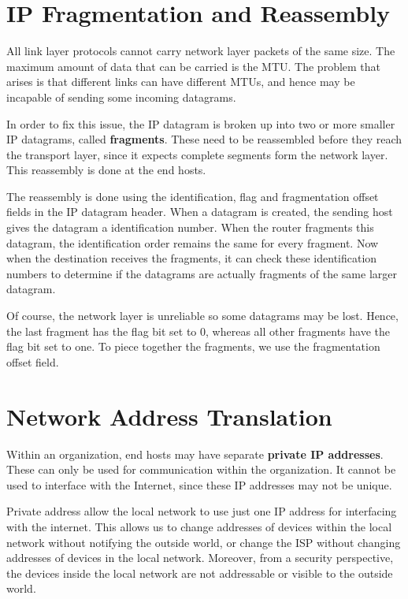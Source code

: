 \documentclass[12pt,letterpaper]{book}
\theoremstyle{definition}
\begin{document}
\section{IP Fragmentation and Reassembly}

All link layer protocols cannot carry network layer packets of the same size. The maximum amount of data that can be carried is the MTU. The problem that arises is that different links can have different MTUs, and hence may be incapable of sending some incoming datagrams.

In order to fix this issue, the IP datagram is broken up into two or more smaller IP datagrams, called \textbf{fragments}. These need to be reassembled before they reach the transport layer, since it expects complete segments form the network layer. This reassembly is done at the end hosts.

The reassembly is done using the identification, flag and fragmentation offset fields in the IP datagram header. When a datagram is created, the sending host gives the datagram a identification number. When the router fragments this datagram, the identification order remains the same for every fragment. Now when the destination receives the fragments, it can check these identification numbers to determine if the datagrams are actually fragments of the same larger datagram.

Of course, the network layer is unreliable so some datagrams may be lost. Hence, the last fragment has the flag bit set to 0, whereas all other fragments have the flag bit set to one. To piece together the fragments, we use the fragmentation offset field.

\section{Network Address Translation}

Within an organization, end hosts may have separate \textbf{private IP addresses}. These can only be used for communication within the organization. It cannot be used to interface with the Internet, since these IP addresses may not be unique.

Private address allow the local network to use just one IP address for interfacing with the internet. This allows us to change addresses of devices within the local network without notifying the outside world, or change the ISP without changing addresses of devices in the local network. Moreover, from a security perspective, the devices inside the local network are not addressable or visible to the outside world.
\end{document}
